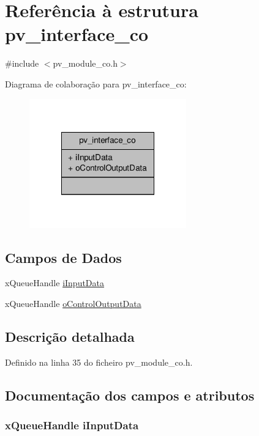 \hypertarget{structpv__interface__co}{\section{Referência à estrutura pv\-\_\-interface\-\_\-co}
\label{structpv__interface__co}
}


{\ttfamily \#include $<$pv\-\_\-module\-\_\-co.\-h$>$}



Diagrama de colaboração para pv\-\_\-interface\-\_\-co\-:
\nopagebreak
\begin{figure}[H]
\begin{center}
\leavevmode
\includegraphics[width=192pt]{structpv__interface__co__coll__graph}
\end{center}
\end{figure}
\subsection*{Campos de Dados}
\begin{DoxyCompactItemize}
\item 
x\-Queue\-Handle \hyperlink{structpv__interface__co_ad057767ef15274f0933ad1821fea7239}{i\-Input\-Data}
\item 
x\-Queue\-Handle \hyperlink{structpv__interface__co_adeb92ab25c31742c709ae51f96cbf10a}{o\-Control\-Output\-Data}
\end{DoxyCompactItemize}


\subsection{Descrição detalhada}


Definido na linha 35 do ficheiro pv\-\_\-module\-\_\-co.\-h.



\subsection{Documentação dos campos e atributos}
\hypertarget{structpv__interface__co_ad057767ef15274f0933ad1821fea7239}{
\subsubsection[{i\-Input\-Data}]{\setlength{\rightskip}{0pt plus 5cm}x\-Queue\-Handle i\-Input\-Data}}\label{structpv__interface__co_ad057767ef15274f0933ad1821fea7239}


